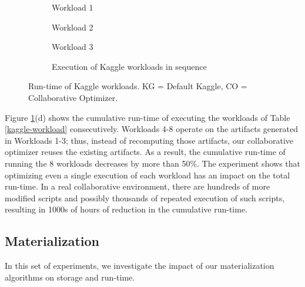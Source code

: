 \begin{figure}[h]
\begin{subfigure}[b]{0.33\linewidth}
\centering
 \resizebox{\columnwidth}{!}{%
%
}
\caption{Workload 1}
\end{subfigure}%
\begin{subfigure}[b]{0.33\linewidth}
\centering
 \resizebox{\columnwidth}{!}{%
%
}
\caption{Workload 2}
\end{subfigure}%
\begin{subfigure}[b]{0.33\linewidth}
\centering
 \resizebox{\columnwidth}{!}{%
%
}
\caption{Workload 3}
\end{subfigure}
\begin{subfigure}[b]{\linewidth}
\centering
 \resizebox{\columnwidth}{!}{%
%
}
\caption{Execution of Kaggle workloads in sequence}
\end{subfigure}
\caption{Run-time of Kaggle workloads. KG = Default Kaggle, CO = Collaborative Optimizer.}
\label{exp-reuse-kaggle-same-workload}
\end{figure}

Figure \ref{exp-reuse-kaggle-same-workload}(d) shows the cumulative run-time of executing the workloads of Table \ref{kaggle-workload} consecutively.
Workloads 4-8 operate on the artifacts generated in Workloads 1-3; thus, instead of recomputing those artifacts, our collaborative optimizer reuses the existing artifacts.
As a result, the cumulative run-time of running the 8 workloads decreases by more than 50\%.
The experiment shows that optimizing even a single execution of each workload has an impact on the total run-time.
In a real collaborative environment, there are hundreds of more modified scripts and possibly thousands of repeated execution of such scripts, resulting in 1000s of hours of reduction in the cumulative run-time.
\subsection{Materialization}
In this set of experiments, we investigate the impact of our materialization algorithms on storage and run-time.

